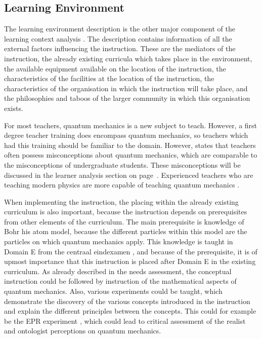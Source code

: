 \documentclass[11pt,twoside]{report} %
\begin{document}

\subsection{Learning Environment}

The learning environment description is the other major component of the learning context analysis \cite{smithragan}. The description contains information of all the external factors influencing the instruction. These are the mediators of the instruction, the already existing curricula which takes place in the environment, the available equipment available on the location of the instruction, the characteristics of the facilities at the location of the instruction, the characteristics of the organisation in which the instruction will take place, and the philosophies and taboos of the larger community in which this organisation exists.

For most teachers, quantum mechanics is a new subject to teach. However, a first degree teacher training \cite{leraarnatuurkundemaster} does encompass quantum mechanics, so teachers which had this training should be familiar to the domain. However,  states that teachers often possess misconceptions about quantum mechanics, which are comparable to the misconceptions of undergraduate students. These misconceptions will be discussed in the learner analysis section on page~\pageref{subsec:misconceptions}. Experienced teachers who are teaching modern physics are more capable of teaching quantum mechanics \cite{asikainen}.

When implementing the instruction, the placing within the already existing curriculum is also important, because the instruction depends on prerequisites from other elements of the curriculum. The main prerequisite is knowledge of Bohr his atom model, because the different particles within this model are the particles on which quantum mechanics apply. This knowledge is taught in Domain E from the centraal eindexamen \cite{eindexamen2016}, and because of the prerequisite, it is of upmost importance that this instruction is placed after Domain E in the existing curriculum. As already described in the needs assessment, the conceptual instruction could be followed by instruction of the mathematical aspects of quantum mechanics. Also, various experiments could be taught, which demonstrate the discovery of the various concepts introduced in the instruction and explain the different principles between the concepts. This could for example be the EPR experiment \cite{kuttner, muller, velentzas}, which could lead to critical assessment of the realist and ontologist perceptions on quantum mechanics.
\end{document}
